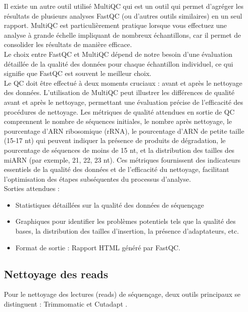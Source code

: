 \documentclass{report}
\begin{document}
Il existe un autre outil utilisé MultiQC \cite{multiqc} qui est un outil qui permet d'agréger les résultats de plusieurs analyses FastQC (ou d'autres outils similaires) en un seul rapport. MultiQC est particulièrement pratique lorsque vous effectuez une analyse à grande échelle impliquant de nombreux échantillons, car il permet de consolider les résultats de manière efficace. \\

Le choix entre FastQC et MultiQC dépend de notre besoin d'une évaluation détaillée de la qualité des données pour chaque échantillon individuel, ce qui signifie que FastQC est souvent le meilleur choix.\\

Le QC doit être effectué à deux moments cruciaux : avant et après le nettoyage des données. L'utilisation de MultiQC peut illustrer les différences de qualité avant et après le nettoyage, permettant une évaluation précise de l'efficacité des procédures de nettoyage. Les métriques de qualité attendues en sortie de QC comprennent le nombre de séquences initiales, le nombre après nettoyage, le pourcentage d'ARN ribosomique (rRNA), le pourcentage d'ARN de petite taille (15-17 nt) qui peuvent indiquer la présence de produits de dégradation, le pourcentage de séquences de moins de 15 nt, et la distribution des tailles des miARN (par exemple, 21, 22, 23 nt). Ces métriques fournissent des indicateurs essentiels de la qualité des données et de l'efficacité du nettoyage, facilitant l'optimisation des étapes subséquentes du processus d'analyse. \\

\noindent Sorties attendues :
\begin{itemize}
    \item Statistiques détaillées sur la qualité des données de séquençage
    \item Graphiques pour identifier les problèmes potentiels tels que la qualité des bases, la distribution des tailles d'insertion, la présence d'adaptateurs, etc.
    \item Format de sortie : Rapport HTML généré par FastQC.
\end{itemize}


\subsection{Nettoyage des reads}
Pour le nettoyage des lectures (reads) de séquençage, deux outils principaux se distinguent :  Trimmomatic \cite{trimmomatic} et  Cutadapt \cite{martin2011cutadapt}.\\
\end{document}
